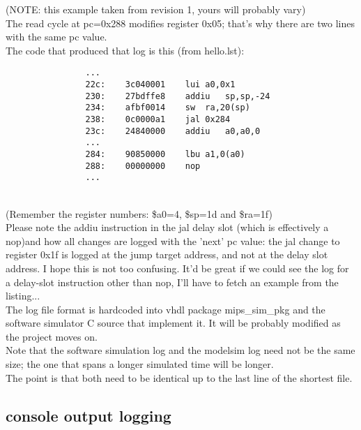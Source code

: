 \documentclass[11pt]{article}
\begin{document}
    (NOTE: this example taken from revision 1, yours will probably vary)\\

    The read cycle at pc=0x288 modifies register 0x05; that's why there are two
    lines with the same pc value.\\

    The code that produced that log is this (from hello.lst):

                \begin{verbatim}
                ...
                22c:    3c040001    lui a0,0x1
                230:    27bdffe8    addiu   sp,sp,-24
                234:    afbf0014    sw  ra,20(sp)
                238:    0c0000a1    jal 0x284
                23c:    24840000    addiu   a0,a0,0
                ...
                284:    90850000    lbu a1,0(a0)
                288:    00000000    nop
                ...
                \end{verbatim}\\

    (Remember the register numbers: \$a0=4, \$sp=1d and \$ra=1f)\\

    Please note the addiu instruction in the jal delay slot (which is
    effectively a nop)and how all changes are logged with the 'next' pc value:
    the jal change to register 0x1f is logged at the jump target address, and
    not at the delay slot address.
    I hope this is not too confusing. It'd be great if we could see the log for
    a delay-slot instruction other than nop, I'll have to fetch an example from
    the listing...\\


    The log file format is hardcoded into vhdl package mips\_sim\_pkg
    and the software simulator C source that implement it. It will
    be probably modified as the project moves on.\\

    Note that the software simulation log and the modelsim log need not be the
    same size; the one that spans a longer simulated time will be longer.\\
    The point is that both need to be identical up to the last line of the
    shortest file.\\
    
\subsection{console output logging}
\label{uart_logging}
\end{document}
